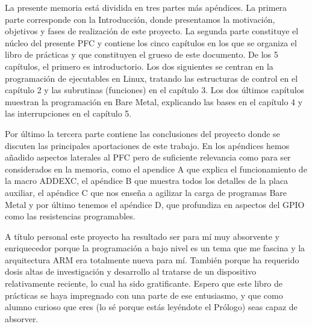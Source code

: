 
La presente memoria está dividida en tres partes más apéndices. La primera
parte corresponde con la Introducción, donde presentamos la motivación, objetivos
y fases de realización de este proyecto. La segunda parte constituye el núcleo
del presente PFC y contiene los cinco capítulos en los que se organiza el
libro de prácticas y que constituyen el grueso de este documento. De los 5
capítulos, el primero es introductorio. Los dos siguientes se centran en la
programación de ejecutables en Linux, tratando las estructuras de control en el
capítulo 2 y las subrutinas (funciones) en el capítulo 3. Los dos últimos
capítulos muestran la programación en Bare Metal, explicando las bases en
el capítulo 4 y las interrupciones en el capítulo 5.

Por último la tercera parte contiene las conclusiones del proyecto donde se
discuten las principales aportaciones de este trabajo. En los apéndices hemos
añadido aspectos laterales al PFC pero de suficiente relevancia como para ser
considerados en la memoria, como el apendice A que explica el funcionamiento
de la macro ADDEXC, el apéndice B que muestra todos los detalles de la placa
auxiliar, el apéndice C que nos enseña a agilizar la carga de programas Bare Metal
y por último tenemos el apéndice D, que profundiza en aspectos del GPIO como
las resistencias programables.

A título personal este proyecto ha resultado ser para mí muy absorvente y enriquecedor porque
la programación a bajo nivel es un tema que me fascina y la arquitectura ARM
era totalmente nueva para mí. También porque ha requerido dosis altas de
investigación y desarrollo al tratarse de un dispositivo relativamente
reciente, lo cual ha sido gratificante. Espero que este libro de prácticas se
haya impregnado con una parte de ese entusiasmo, y que como alumno curioso
que eres (lo sé porque estás leyéndote el Prólogo) seas capaz de absorver.

\chapterend
